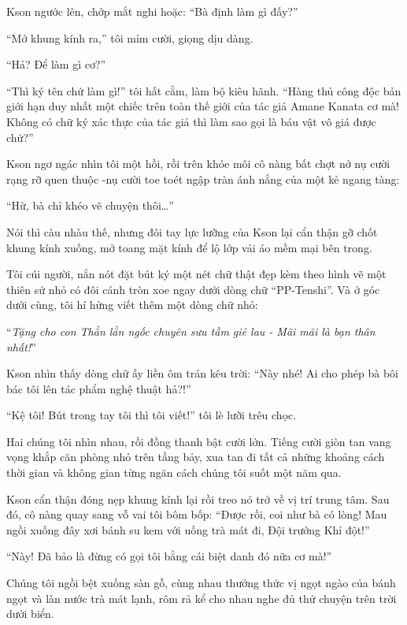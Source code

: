\documentclass[../main.tex]{subfiles}
\begin{document}
Kson ngước lên, chớp mắt nghi hoặc: ``Bà định làm gì đấy?''

``Mở khung kính ra,'' tôi mỉm cười, giọng dịu dàng.

``Hả? Để làm gì cơ?''

``Thì ký tên chứ làm gì!'' tôi hất cằm, làm bộ kiêu hãnh. ``Hàng thủ công độc bản giới hạn duy nhất một chiếc trên toàn thế giới của tác giả Amane Kanata cơ mà! Không có chữ ký xác thực của tác giả thì làm sao gọi là báu vật vô giá được chứ?''

Kson ngơ ngác nhìn tôi một hồi, rồi trên khóe môi cô nàng bất chợt nở nụ cười rạng rỡ quen thuộc -nụ cười toe toét ngập tràn ánh nắng của một kẻ ngang tàng:

``Hừ, bà chỉ khéo vẽ chuyện thôi\dots''

Nói thì càu nhàu thế, nhưng đôi tay lực lưỡng của Kson lại cẩn thận gỡ chốt khung kính xuống, mở toang mặt kính để lộ lớp vải áo mềm mại bên trong.

Tôi cúi người, nắn nót đặt bút ký một nét chữ thật đẹp kèm theo hình vẽ một thiên sứ nhỏ có đôi cánh tròn xoe ngay dưới dòng chữ ``PP-Tenshi''. Và ở góc dưới cùng, tôi hí hửng viết thêm một dòng chữ nhỏ:

\begin{center}
  ``\textit{Tặng cho con Thằn lằn ngốc chuyên sưu tầm giẻ lau - Mãi mãi là bạn thân nhất!}''
\end{center}

Kson nhìn thấy dòng chữ ấy liền ôm trán kêu trời: ``Này nhé! Ai cho phép bà bôi bác tôi lên tác phẩm nghệ thuật hả?!''

``Kệ tôi! Bút trong tay tôi thì tôi viết!'' tôi lè lưỡi trêu chọc.

Hai chúng tôi nhìn nhau, rồi đồng thanh bật cười lớn. Tiếng cười giòn tan vang vọng khắp căn phòng nhỏ trên tầng bảy, xua tan đi tất cả những khoảng cách thời gian và không gian từng ngăn cách chúng tôi suốt một năm qua.

Kson cẩn thận đóng nẹp khung kính lại rồi treo nó trở về vị trí trung tâm. Sau đó, cô nàng quay sang vỗ vai tôi bôm bốp: ``Được rồi, coi như bà có lòng! Mau ngồi xuống đây xơi bánh su kem với uống trà mát đi, Đội trưởng Khỉ đột!''

``Này! Đã bảo là đừng có gọi tôi bằng cái biệt danh đó nữa cơ mà!''

Chúng tôi ngồi bệt xuống sàn gỗ, cùng nhau thưởng thức vị ngọt ngào của bánh ngọt và làn nước trà mát lạnh, rôm rả kể cho nhau nghe đủ thứ chuyện trên trời dưới biển.
\end{document}
